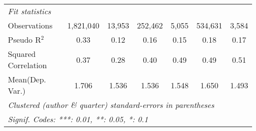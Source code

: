 \begin{tabular}{lcccccc}
   \midrule
   \emph{Fit statistics}\\
   Observations                                               & 1,821,040   & 13,953  & 252,462       & 5,055         & 534,631       & 3,584\\  
   Pseudo R$^2$                                               & 0.33        & 0.12    & 0.16          & 0.15          & 0.18          & 0.17\\  
   Squared Correlation                                        & 0.37        & 0.28    & 0.40          & 0.49          & 0.49          & 0.51\\  
Mean(Dep. Var.) & 1.706 & 1.536 & 1.536 & 1.548 & 1.650 & 1.493 \\
   \midrule \midrule
   \multicolumn{7}{l}{\emph{Clustered (author \& quarter) standard-errors in parentheses}}\\
   \multicolumn{7}{l}{\emph{Signif. Codes: ***: 0.01, **: 0.05, *: 0.1}}\\
\end{tabular}
\par\endgroup

